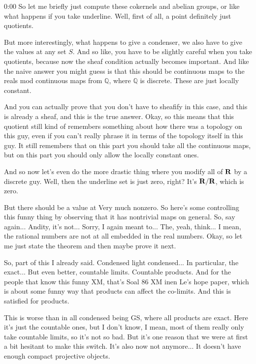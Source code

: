 \begin{unfinished}{0:00}
So let me briefly just compute these cokernels and abelian groups, or like what happens if you take underline. Well, first of all, a point definitely just quotients.

But more interestingly, what happens to give a condenser, we also have to give the values at any set $S$. And so like, you have to be slightly careful when you take quotients, because now the sheaf condition actually becomes important. And like the naive answer you might guess is that this should be continuous maps to the reals mod continuous maps from $\mathbb{Q}$, where $\mathbb{Q}$ is discrete. These are just locally constant.

And you can actually prove that you don't have to sheafify in this case, and this is already a sheaf, and this is the true answer. Okay, so this means that this quotient still kind of remembers something about how there was a topology on this guy, even if you can't really phrase it in terms of the topology itself in this guy. It still remembers that on this part you should take all the continuous maps, but on this part you should only allow the locally constant ones.

And so now let's even do the more drastic thing where you modify all of $\mathbf R$ by a discrete guy. Well, then the underline set is just zero, right? It's $\mathbf R/\mathbf R$, which is zero.

But there should be a value at 
Very much nonzero. So here's some controlling this funny thing by observing that it has nontrivial maps on general. So, say again... Andity, it's not... Sorry, I again meant to... The, yeah, think... I mean, the rational numbers are not at all embedded in the real numbers. Okay, so let me just state the theorem and then maybe prove it next.

So, part of this I already said. Condensed light condensed... In particular, the exact... But even better, countable limits. Countable products. And for the people that know this funny XM, that's Soal 86 XM inen Le's hope paper, which is about some funny way that products can affect the co-limits. And this is satisfied for products.

This is worse than in all condensed being GS, where all products are exact. Here it's just the countable ones, but I don't know, I mean, most of them really only take countable limits, so it's not so bad. But it's one reason that we were at first a bit hesitant to make this switch. It's also now not anymore... It doesn't have enough compact projective objects.


\end{unfinished}
